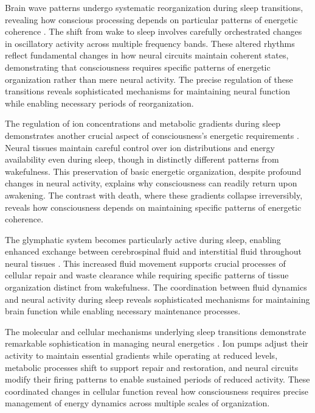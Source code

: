 \begin{refsection}
Brain wave patterns undergo systematic reorganization during sleep transitions, revealing how conscious processing depends on particular patterns of energetic coherence \cite{Scammell2017}. The shift from wake to sleep involves carefully orchestrated changes in oscillatory activity across multiple frequency bands. These altered rhythms reflect fundamental changes in how neural circuits maintain coherent states, demonstrating that consciousness requires specific patterns of energetic organization rather than mere neural activity. The precise regulation of these transitions reveals sophisticated mechanisms for maintaining neural function while enabling necessary periods of reorganization.

The regulation of ion concentrations and metabolic gradients during sleep demonstrates another crucial aspect of consciousness's energetic requirements \cite{DiNuzzo2017}. Neural tissues maintain careful control over ion distributions and energy availability even during sleep, though in distinctly different patterns from wakefulness. This preservation of basic energetic organization, despite profound changes in neural activity, explains why consciousness can readily return upon awakening. The contrast with death, where these gradients collapse irreversibly, reveals how consciousness depends on maintaining specific patterns of energetic coherence.

The glymphatic system becomes particularly active during sleep, enabling enhanced exchange between cerebrospinal fluid and interstitial fluid throughout neural tissues \cite{Nedergaard2020}. This increased fluid movement supports crucial processes of cellular repair and waste clearance while requiring specific patterns of tissue organization distinct from wakefulness. The coordination between fluid dynamics and neural activity during sleep reveals sophisticated mechanisms for maintaining brain function while enabling necessary maintenance processes.

The molecular and cellular mechanisms underlying sleep transitions demonstrate remarkable sophistication in managing neural energetics \cite{Holst2018}. Ion pumps adjust their activity to maintain essential gradients while operating at reduced levels, metabolic processes shift to support repair and restoration, and neural circuits modify their firing patterns to enable sustained periods of reduced activity. These coordinated changes in cellular function reveal how consciousness requires precise management of energy dynamics across multiple scales of organization.


\end{refsection}

